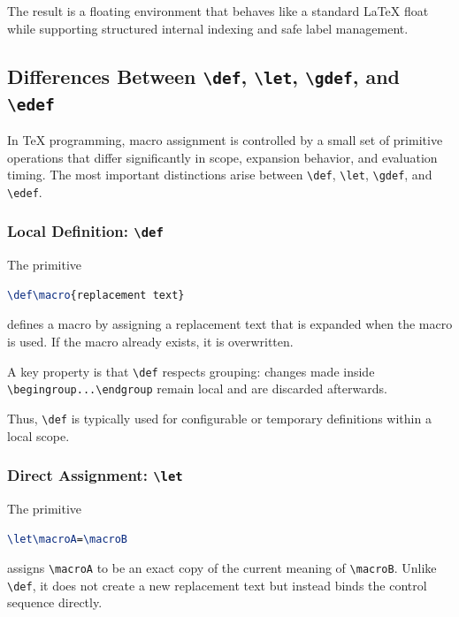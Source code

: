 The result is a floating environment that behaves like a standard LaTeX float while supporting structured internal indexing and safe label management.

\subsection{Differences Between \texttt{\textbackslash def}, \texttt{\textbackslash let}, \texttt{\textbackslash gdef}, and \texttt{\textbackslash edef}}

In \TeX{} programming, macro assignment is controlled by a small set of primitive operations that differ significantly in scope, expansion behavior, and evaluation timing. The most important distinctions arise between \lstinline|\def|, \lstinline|\let|, \lstinline|\gdef|, and \lstinline|\edef|.

\subsubsection{Local Definition: \texttt{\textbackslash def}}

The primitive

\begin{lstlisting}[language=LaTeX]
\def\macro{replacement text}
\end{lstlisting}

defines a macro by assigning a replacement text that is expanded when the macro is used. If the macro already exists, it is overwritten.

A key property is that \lstinline|\def| respects grouping: changes made inside \lstinline|\begingroup...\endgroup| remain local and are discarded afterwards.

Thus, \lstinline|\def| is typically used for configurable or temporary definitions within a local scope.

\subsubsection{Direct Assignment: \texttt{\textbackslash let}}

The primitive

\begin{lstlisting}[language=LaTeX]
\let\macroA=\macroB
\end{lstlisting}

assigns \lstinline|\macroA| to be an exact copy of the current meaning of \lstinline|\macroB|. Unlike \lstinline|\def|, it does not create a new replacement text but instead binds the control sequence directly.

